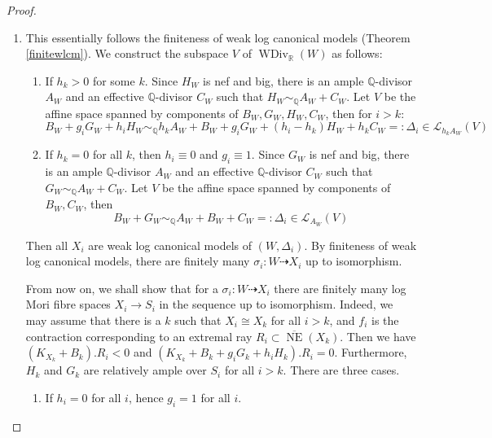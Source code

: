 \begin{proof}
  \begin{enumerate}
    \item This essentially follows the finiteness of weak log canonical models (Theorem \ref{finitewlcm}). We construct the subspace $V$ of $\operatorname{WDiv}_{\mathbb{R}}(W)$ as follows:
      \begin{enumerate}
        \item If $h_{k}>0$ for some $k$. Since $H_{W}$ is nef and big,  there is an  ample $\mathbb{Q}$-divisor $A_{W}$ and an effective $\mathbb{Q}$-divisor $C_{W}$  such that $H_{W}\sim_{\mathbb{Q}}A_{W}+C_{W}$. Let $V$ be the affine space spanned by components of  $B_{W},G_{W},H_{W},C_{W}$, then for $i>k$:
              \[
                  B_{W}+g_{i}G_{W}+h_{i}H_{W}\sim_{\mathbb{Q}} h_{k}A_{W}+B_{W}+g_{i}G_{W}+(h_{i}-h_{k})H_{W}+h_{k}C_{W}=:\Delta_{i} \in \mathcal{L}_{h_{k}A_{W}}(V)
              \]
        \item If $h_{k}=0$ for all $k$, then $h_{i}\equiv 0$ and $g_{i}\equiv 1$.  Since $G_{W}$ is nef and big,  there is  an  ample $\mathbb{Q}$-divisor $A_{W}$ and an effective $\mathbb{Q}$-divisor $C_{W}$  such that $G_{W}\sim_{\mathbb{Q}}A_{W}+C_{W}$. Let $V$ be the affine space spanned by components of  $B_{W},C_{W}$, then
              \[
                  B_{W}+G_{W}\sim_{\mathbb{Q}} A_{W}+B_{W}+C_{W}=:\Delta_{i} \in \mathcal{L}_{A_{W}}(V)
              \]
      \end{enumerate}
          Then all $X_{i}$ are weak log canonical models of $(W,\Delta_{i})$. By finiteness of weak log canonical models, there are finitely many $\sigma_{i}: W\dashrightarrow X_{i}$ up to isomorphism.

          From now on, we shall show that for a $\sigma_{i}: W\dashrightarrow X_{i}$ there are finitely many log Mori fibre spaces $X_i\to S_i$ in the sequence up to isomorphism.
          Indeed, we may assume that there is a $k$ such that $X_{i} \cong X_{k}$ for all $i>k$, and  $f_{i}$ is the contraction corresponding to an extremal ray $R_{i} \subset \overline{\operatorname{NE}}(X_{k}) $. Then we have $(K_{X_{k}}+B_{k}).R_{i}<0  $ and $(K_{X_{k}}+B_{k}+g_{i}G_{k}+h_{i}H_{k}).R_{i}=0$. Furthermore, $H_{k}$ and $G_{k}$ are relatively ample over $S_{i}$ for all $i>k$. There are three cases.

          \begin{enumerate}
            \item If $h_{i}=0$ for all $i$, hence $g_{i}=1$ for all $i$.


\end{enumerate}
\end{enumerate}
\end{proof}
